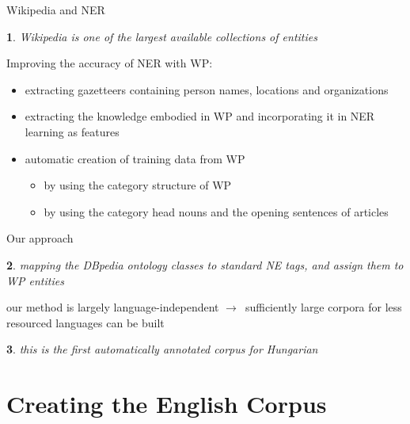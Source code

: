 \documentclass[utf8x]{beamer}
\newcommand{\nyil}{$\rightarrow$\ }
\newtheorem{nix}{}[section]
\begin{document}
\begin{frame}{Wikipedia and NER}

\begin{nix}
Wikipedia is one of the largest available collections of entities
\end{nix}

\smallskip

Improving the accuracy of NER with WP:

\begin{itemize}
\item extracting gazetteers containing person names, locations and organizations 
\item extracting the knowledge embodied in WP and incorporating it in NER learning as features
\item automatic creation of training data from WP
\begin{itemize}
\item by using the category structure of WP
\item by using the category head nouns and the opening sentences of articles
\end{itemize} 
\end{itemize}

\end{frame}

\begin{frame}{Our approach}

\begin{nix}
mapping the DBpedia ontology classes to standard NE tags, and assign them to WP entities
\end{nix}

\bigskip

our method is largely language-independent \nyil sufficiently large corpora for less resourced languages can be built 

\bigskip

\begin{nix}
this is the first automatically annotated corpus for Hungarian 
\end{nix}

\end{frame}

\section{Creating the English Corpus}
\end{document}
